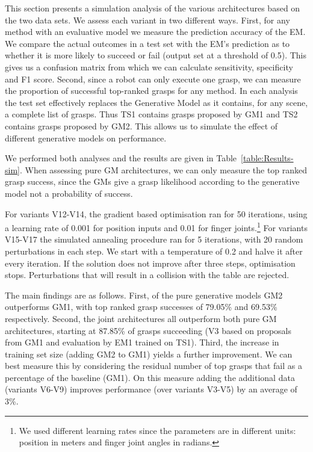 This section presents a simulation analysis of the various architectures based on the two data sets. 
We assess each variant in two different ways. First, for any method with an evaluative model we  measure the prediction accuracy of the EM. We compare the actual outcomes in a test set with the EM's prediction as to whether it is more likely to succeed or fail (output set at a threshold of 0.5). This gives us a confusion matrix from which we can calculate sensitivity, specificity and F1 score. Second, since a robot can only execute one grasp, we can measure the proportion of successful top-ranked grasps for any method. In each analysis the test set effectively replaces the Generative Model as it contains, for any scene, a complete list of grasps. Thus TS1 contains grasps proposed by GM1 and TS2 contains grasps proposed by GM2. This allows us to simulate the effect of different generative models on performance. 

We performed both analyses and the results are given in Table~\ref{table:Results-sim}. When assessing pure GM architectures, we can only measure the top ranked grasp success, since the GMs give a grasp likelihood according to the generative model not a probability of success. 

For variants V12-V14, the gradient based optimisation ran for 50 iterations, using a learning rate of 0.001 for position inputs and 0.01 for finger joints.\footnote{We used different learning rates since the parameters are in different units: position in meters and finger joint angles in radians.} For variants V15-V17 the simulated annealing procedure ran for 5 iterations, with 20 random perturbations in each step. We start with a temperature of 0.2 and halve it after every iteration. If the solution does not improve after three steps, optimisation stops. Perturbations that will result in a collision with the table are rejected.

The main findings are as follows. First, of the pure generative models GM2 outperforms GM1, with top ranked grasp successes of 79.05\% and 69.53\% respectively. Second, the joint architectures all outperform both pure GM architectures, starting at 87.85\% of grasps succeeding (V3 based on proposals from GM1 and evaluation by EM1 trained on TS1). Third, the increase in training set size (adding GM2 to GM1) yields a further improvement. We can best measure this by considering the residual number of top grasps that fail as a percentage of the baseline (GM1). On this measure adding the additional data (variants V6-V9) improves performance (over variants V3-V5) by an average of 3\%.

